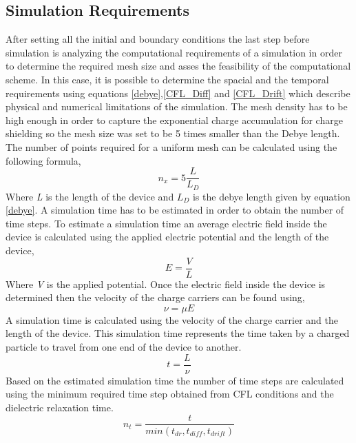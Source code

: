 \begin{doublespace}
\clearpage
\section{Simulation Requirements}
After setting all the initial and boundary conditions the last step before simulation is analyzing the computational requirements of a simulation in order to determine the required mesh size and asses the feasibility of the computational scheme. In this case, it is possible to determine the spacial and the temporal requirements using  equations \ref{debye},\ref{CFL_Diff} and \ref{CFL_Drift} which describe physical and numerical limitations of the simulation. The mesh density has to be high enough in order to capture the exponential charge accumulation for charge shielding so the mesh size was set to be 5 times smaller than the Debye length. The number of points required for a uniform mesh can be calculated using the following formula,
\begin{equation}
n_x = 5\frac{L}{L_{D}}
\end{equation} 
Where \textit{L} is the length of the device and $L_{D}$ is the debye length given by equation \ref{debye}. A simulation time has to be estimated in order to obtain the number of time steps. To estimate a simulation time an average electric field inside the device is calculated using the applied electric potential and the length of the device,
\begin{equation}
E = \frac{V}{L}
\end{equation} 
Where \textit{V} is the applied potential. Once the electric field inside the device is determined then the velocity of the charge carriers can be found using,
\begin{equation}
\nu = \mu E
\end{equation} 
A simulation time is calculated using the velocity of the charge carrier and the length of the device. This simulation time represents the time taken by a charged particle to travel from one end of the device to another.  
\begin{equation}
t = \frac{L}{\nu} 
\end{equation} 
Based on the estimated simulation time the number of time steps are calculated using the minimum required time step obtained from CFL conditions and the dielectric relaxation time.
\begin{equation}
n_{t} = \frac{t}{min(t_{dr},t_{diff},t_{drift})} 
\end{equation} 
 \begin{table}

\end{table}
\end{doublespace}
